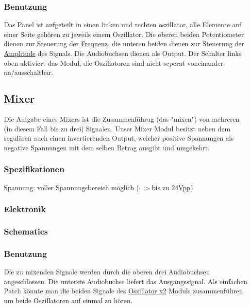 \subsubsection{Benutzung}
\label{sec:org56700b2}
Das Panel ist aufgeteilt in einen linken und rechten oszillator, alle Elemente auf einer Seite gehören zu jeweils einem Oszillator. Die oberen beiden Potentiometer dienen zur Steuerung der \href{file:///home/felixp/Documents/diplomarbeit/dokumentation/content/theoretische\_grundlagen.org}{Frequenz}, die unteren beiden dienen zur Steuerung der \href{file:///home/felixp/Documents/diplomarbeit/dokumentation/content/theoretische\_grundlagen.org}{Amplitude} des Signals. Die Audiobuchsen dienen als Output. Der Schalter links oben aktiviert das Modul, die Oszillatoren sind nicht seperat voneinander an/ausschaltbar.

\subsection{Mixer}
\label{sec:org94c54da}
Die Aufgabe eines Mixers ist die Zusammenführug (das "mixen") von mehreren (in diesem Fall bis zu drei) Signalen. Unser Mixer Modul besitzt neben dem regulären auch einen invertierenden Output, welcher positive Spannungen als negative Spannungen mit dem selben Betrag ausgibt und umgekehrt.

\subsubsection{Spezifikationen}
\label{sec:org93eee82}
Spannung: voller Spannungsbereich möglich (=> bis zu 24\href{file:///home/felixp/Documents/diplomarbeit/dokumentation/content/hauptteil.org}{Vpp})
\subsubsection{Elektronik}
\label{sec:org640a115}
\subsubsection{Schematics}
\label{sec:org5a083b0}
\subsubsection{Benutzung}
\label{sec:orgd855ed0}
Die zu mixenden Signale werden durch die oberen drei Audiobuchsen angeschlossen. Die unterste Audiobuchse liefert das Ausgangssignal. Als einfachen Patch könnte man die beiden Signale des \href{modules/oscillator.org}{Oszillator x2} Moduls zusammenführen um beide Oszillatoren auf einmal zu hören.

